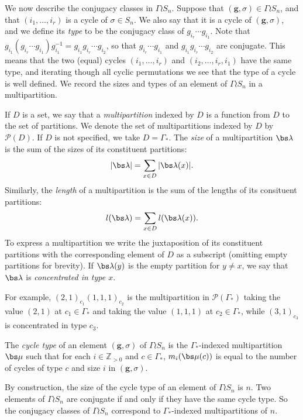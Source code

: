 We now describe the conjugacy classes in $\Gamma \wr S_n$. Suppose that $(\mathbf{g}, \sigma) \in \Gamma \wr S_n$, and that $(i_1, \ldots, i_r)$ is a cycle of $\sigma \in S_n$. We also say that it is a cycle of $(\mathbf{g}, \sigma)$, and we define its \emph{type} to be the conjugacy class of $g_{i_r} \cdots g_{i_1}$. Note that $g_{i_1}(g_{i_r} \cdots g_{i_1})g_{i_1}^{-1} = g_{i_1} g_{i_r}\cdots g_{i_2}$, so that $g_{i_r} \cdots g_{i_1}$ and $g_{i_1} g_{i_r} \cdots g_{i_2}$ are conjugate. This means that the two (equal) cycles $(i_1, \ldots, i_r)$ and $(i_2, \ldots, i_r, i_1)$ have the same type, and iterating though all cyclic permutations we see that the type of a cycle is well defined. We record the sizes and types of an element of $\Gamma \wr S_n$ in a multipartition.
\begin{definition}
If $D$ is a set, we say that a \emph{multipartition} indexed by $D$ is a function from $D$ to the set of partitions. We denote the set of multipartitions indexed by $D$ by $\mathcal{P}(D)$. If $D$ is not specified, we take $D = \Gamma_*$. The \emph{size} of a multipartition $\bs \lambda$ is the sum of the sizes of its constituent partitions:
\[
|\bs \lambda| = \sum_{x \in D} |\bs\lambda(x)|.
\]
Similarly, the \emph{length} of a multipartition is the sum of the lengths of its consituent partitions:
\[
l(\bs \lambda) = \sum_{x \in D} l(\bs\lambda(x)).
\]
To express a multipartition we write the juxtaposition of its constituent partitions with the corresponding element of $D$ as a subscript \textup{(}omitting empty partitions for brevity\textup{)}. If $\bs\lambda(y)$ is the empty partition for $y \neq x$, we say that $\bs\lambda$ is \emph{concentrated in type $x$}.
\end{definition}

For example, $(2,1)_{c_1} (1,1,1)_{c_2}$ is the multipartition in $\mathcal{P}(\Gamma_*)$ taking the value $(2,1)$ at $c_1 \in \Gamma_*$ and taking the value $(1,1,1)$ at $c_2 \in \Gamma_*$, while $(3,1)_{c_3}$ is concentrated in type $c_3$.
\begin{definition}
The \emph{cycle type} of an element $(\mathbf{g}, \sigma)$ of $\Gamma \wr S_n$ is the $\Gamma_*$-indexed multipartition $\bs \mu$ such that for each $i \in \mathbb{Z}_{>0}$ and $c \in \Gamma_*$, $m_i(\bs\mu(c))$ is equal to the number of cycles of type $c$ and size $i$ in $(\mathbf{g}, \sigma)$.
\end{definition}

By construction, the size of the cycle type of an element of $\Gamma \wr S_n$ is $n$. Two elements of $\Gamma \wr S_n$ are conjugate if and only if they have the same cycle type. So the conjugacy classes of $\Gamma \wr S_n$ correspond to $\Gamma_*$-indexed multipartitions of $n$.

